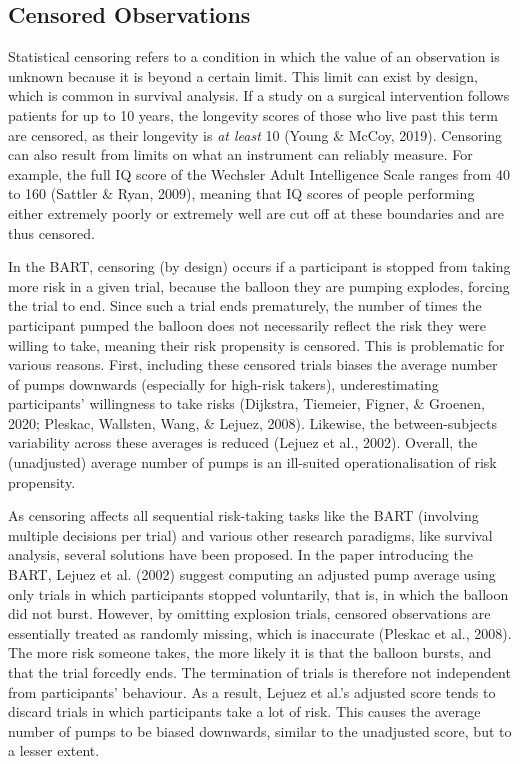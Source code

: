 \documentclass[serif, twocolumn, review]{jote-article}
\begin{document}
{}\subsection*{Censored Observations}

Statistical censoring refers to a condition in which the value of an observation is unknown because it is beyond a certain limit. This limit can exist by design, which is common in survival analysis. If a study on a surgical intervention follows patients for up to 10 years, the longevity scores of those who live past this term are censored, as their longevity is \textit{at least} 10 (Young \& McCoy, 2019). Censoring can also result from limits on what an instrument can reliably measure. For example, the full IQ score of the Wechsler Adult Intelligence Scale ranges from 40 to 160 (Sattler \& Ryan, 2009), meaning that IQ scores of people performing either extremely poorly or extremely well are cut off at these boundaries and are thus censored.

In the BART, censoring (by design) occurs if a participant is stopped from taking more risk in a given trial, because the balloon they are pumping explodes, forcing the trial to end. Since such a trial ends prematurely, the number of times the participant pumped the balloon does not necessarily reflect the risk they were willing to take, meaning their risk propensity is censored. This is problematic for various reasons. First, including these censored trials biases the average number of pumps downwards (especially for high-risk takers), underestimating participants' willingness to take risks (Dijkstra, Tiemeier, Figner, \& Groenen, 2020; Pleskac, Wallsten, Wang, \& Lejuez, 2008). Likewise, the between-subjects variability across these averages is reduced (Lejuez et al., 2002). Overall, the (unadjusted) average number of pumps is an ill-suited operationalisation of risk propensity.

As censoring affects all sequential risk-taking tasks like the BART (involving multiple decisions per trial) and various other research paradigms, like survival analysis, several solutions have been proposed. In the paper introducing the BART, Lejuez et al. (2002) suggest computing an adjusted pump average using only trials in which participants stopped voluntarily, that is, in which the balloon did not burst. However, by omitting explosion trials, censored observations are essentially treated as randomly missing, which is inaccurate (Pleskac et al., 2008). The more risk someone takes, the more likely it is that the balloon bursts, and that the trial forcedly ends. The termination of trials is therefore not independent from participants' behaviour. As a result, Lejuez et al.'s adjusted score tends to discard trials in which participants take a lot of risk. This causes the average number of pumps to be biased downwards, similar to the unadjusted score, but to a lesser extent.
\end{document}
